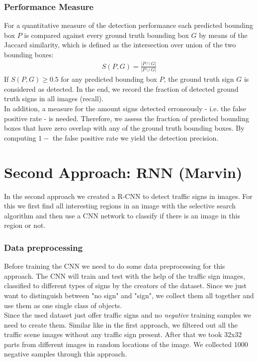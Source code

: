 \documentclass[12pt,a4paper,bibliography=totocnumbered,listof=totocnumbered]{scrartcl}
\begin{document}
\subsubsection{Performance Measure} \label{ssec:perf}
For a quantitative measure of the detection performance each predicted bounding box $P$ is compared against every ground truth bounding box $G$ by means of the Jaccard similarity, which is defined as the intersection over union of the two bounding boxes: 
\begin{align*}
	S(P,G) = \frac{|P \cap G|}{|P \cup G|}
\end{align*}
If $S(P,G) \geq 0.5$ for any predicted bounding box $P$, the ground truth sign $G$ is considered as detected. In the end, we record the fraction of detected ground truth signs in all images (recall). \\
In addition, a measure for the amount signs detected erroneously - i.e. the false positive rate - is needed.  Therefore, we assess the fraction of predicted bounding boxes that have zero overlap with any of the ground truth bounding boxes. By computing $1-$ the false positive rate we yield the detection precision. 

\pagebreak
\section{Second Approach: RNN \small{(Marvin)}}

In the second approach we created a R-CNN to detect traffic signs in images. For this we first find all interesting regions in an image with the selective search algorithm and then use a CNN network to classify if there is an image in this region or not.

\subsubsection{Data preprocessing}

Before training the CNN we need to do some data preprocessing for this approach. The CNN will train and test with the help of the traffic sign images, classified to different types of signs by the creators of the dataset. Since we just want to distinguish between "no sign" and "sign", we collect them all together and use them as one single class of objects.\\Since the used dataset just offer traffic signs and no \textit{negative} training samples we need to create them. Similar like in the first approach, we filtered out all the traffic scene images without any traffic sign present. After that we took 32x32 parts from different images in random locations of the image. We collected 1000 negative samples through this approach.\\\\
\end{document}

